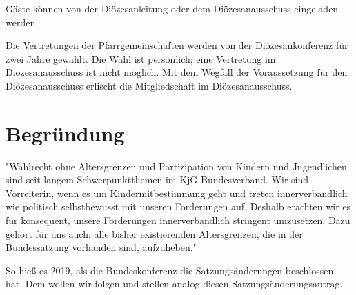 \documentclass[12pt]{report}
\begin{document}
\begin{flushleft}
Gäste können von der Diözesanleitung oder dem Diözesanausschuss eingeladen werden.

Die Vertretungen der Pfarrgemeinschaften werden von der Diözesankonferenz für zwei Jahre
gewählt. Die Wahl ist persönlich; eine Vertretung im Diözesanausschuss ist nicht möglich. Mit
dem Wegfall der Voraussetzung für den Diözesanausschuss erlischt die Mitgliedschaft im Diözesanausschuss.

\chapter*{Begründung}

"Wahlrecht ohne Altersgrenzen und Partizipation von Kindern und Jugendlichen
sind seit langem Schwerpunktthemen im KjG Bundesverband. Wir sind Vorreiterin,
wenn es um Kindermitbestimmung geht und treten innerverbandlich wie politisch selbstbewusst mit unseren Forderungen auf.
Deshalb erachten wir es für konsequent, unsere Forderungen innerverbandlich stringent umzusetzen.
Dazu gehört für uns auch. alle bisher existierenden Altersgrenzen, die in der Bundessatzung vorhanden sind,
aufzuheben."

So hieß es 2019, als die Bundeskonferenz die Satzungsänderungen beschlossen hat.
Dem wollen wir folgen und stellen analog diesen Satzungsänderungsantrag.

\end{flushleft}
\end{document}
